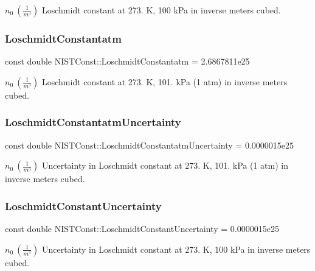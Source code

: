 $n_0 \ (\frac{1}{m^3})$ Loschmidt constant at 273. K, 100 k\+Pa in inverse meters cubed. \mbox{\label{group___loschmidt_constant_ga1442f26c5c9f899f74ef7b546a41c461}} 
\subsubsection{\texorpdfstring{Loschmidt\+Constantatm}{LoschmidtConstantatm}}
{\footnotesize\ttfamily const double N\+I\+S\+T\+Const\+::\+Loschmidt\+Constantatm = 2.\+6867811e25}

$n_0 \ (\frac{1}{m^3})$ Loschmidt constant at 273. K, 101. k\+Pa (1 atm) in inverse meters cubed. \mbox{\label{group___loschmidt_constant_gaed8885c8d2d27d9d8b88c271e0022228}} 
\subsubsection{\texorpdfstring{Loschmidt\+Constantatm\+Uncertainty}{LoschmidtConstantatmUncertainty}}
{\footnotesize\ttfamily const double N\+I\+S\+T\+Const\+::\+Loschmidt\+Constantatm\+Uncertainty = 0.\+0000015e25}

$n_0 \ (\frac{1}{m^3})$ Uncertainty in Loschmidt constant at 273. K, 101. k\+Pa (1 atm) in inverse meters cubed. \mbox{\label{group___loschmidt_constant_gae1bf8845a08d0554f1045083a143c30a}} 
\subsubsection{\texorpdfstring{Loschmidt\+Constant\+Uncertainty}{LoschmidtConstantUncertainty}}
{\footnotesize\ttfamily const double N\+I\+S\+T\+Const\+::\+Loschmidt\+Constant\+Uncertainty = 0.\+0000015e25}

$n_0 \ (\frac{1}{m^3})$ Uncertainty in Loschmidt constant at 273. K, 100 k\+Pa in inverse meters cubed. 